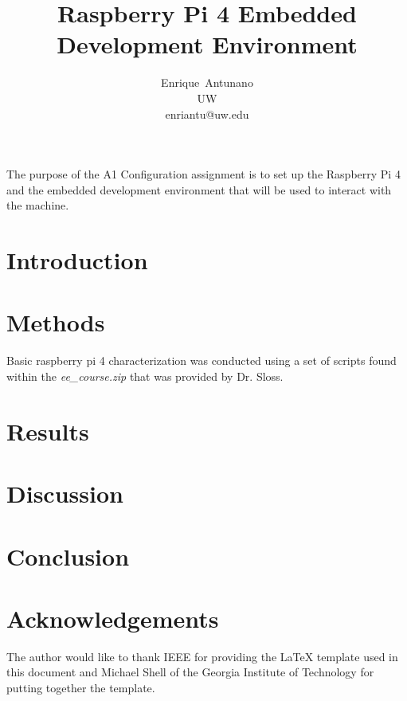 \documentclass[journal]{IEEEtran}
\begin{document}
    \title{Raspberry Pi 4 Embedded Development Environment}

    \author{Enrique~Antunano\\UW\\enriantu@uw.edu}


    \maketitle

    \begin{abstract}

    \end{abstract}
    The purpose of the A1 Configuration assignment is to set up the Raspberry Pi 4 and the embedded development environment that will be used to interact with the machine. 
    \section{Introduction}

    \section{Methods}
    Basic raspberry pi 4 characterization was conducted using a set of scripts found within the \emph{ee\_course.zip} that was provided by Dr. Sloss.


    \section{Results}

    \section{Discussion}

    \section{Conclusion}

    \nocite{*}
    \newpage

    
    

    \newpage
    \section{Acknowledgements}
    The author would like to thank IEEE for providing the LaTeX template used in this document and Michael Shell of the Georgia Institute of Technology for putting together the template.
\end{document}
